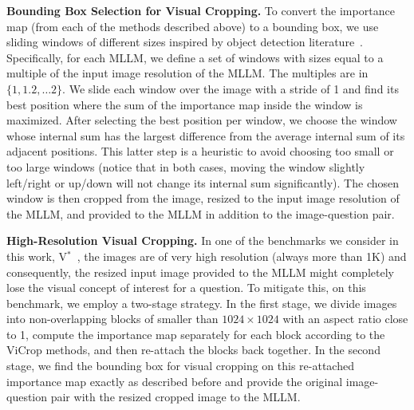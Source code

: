 \textbf{Bounding Box Selection for Visual Cropping.}
To convert the importance map (from each of the methods described above) to a bounding box, we use sliding windows of different sizes inspired by object detection literature~\cite{yolo}. Specifically, for each MLLM, we define a set of windows with sizes equal to a multiple of the input image resolution of the MLLM. The multiples are in $\{1, 1.2, \dots 2\}$. We slide each window over the image with a stride of 1 and find its best position where the sum of the importance map inside the window is maximized. After selecting the best position per window, we choose the window whose internal sum has the largest difference from the average internal sum of its adjacent positions. This latter step is a heuristic to avoid choosing too small or too large windows (notice that in both cases, moving the window slightly left/right or up/down will not change its internal sum significantly). The chosen window is then cropped from the image, resized to the input image resolution of the MLLM, and provided to the MLLM in addition to the image-question pair.

\textbf{High-Resolution Visual Cropping.} In one of the benchmarks we consider in this work, V$^*$~\cite{v-star}, the images are of very high resolution (always more than 1K) and consequently, the resized input image provided to the MLLM might completely lose the visual concept of interest for a question. To mitigate this, on this benchmark, we employ a two-stage strategy. In the first stage, we divide images into non-overlapping blocks of smaller than $1024\times 1024$ with an aspect ratio close to 1, compute the importance map separately for each block according to the ViCrop methods, and then re-attach the blocks back together. In the second stage, we find the bounding box for visual cropping on this re-attached importance map exactly as described before and provide the original image-question pair with the resized cropped image to the MLLM.
